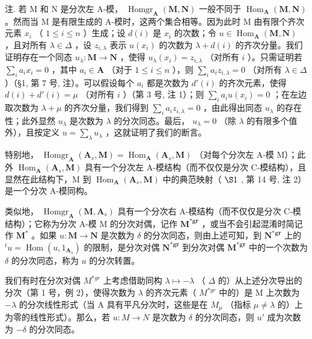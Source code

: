 注. 若 M 和 N 是分次左 A-模， \(\operatorname{Homgr}_{\mathbf{A}}(\mathbf{M}, \mathbf{N})\) 一般不同于 \(\operatorname{Hom}_{\mathbf{A}}(\mathbf{M}, \mathbf{N})\) 。然而当 M 是有限生成的 A-模时，这两个集合相等。因为此时 M 由有限个齐次元素 \(x_{i}\) （ \(1 \leqslant i \leqslant n\) ）生成；设 \(d(i)\) 是 \(x_{i}\) 的次数；令 \(u \in \operatorname{Hom}_{\mathbf{A}}(\mathbf{M}, \mathbf{N})\) ，且对所有 \(\lambda \in \Delta\) ，设 \(z_{i,\lambda}\) 表示 \(u(x_{i})\) 的次数为 \(\lambda + d(i)\) 的齐次分量。我们证明存在一个同态 \(u_{\lambda}: \mathbf{M} \to \mathbf{N}\) ，使得 \(u_{\lambda}(x_{i}) = z_{i,\lambda}\) （对所有 \(i\) ）。只需证明若 \(\sum_{i} a_{i} x_{i} = 0\) ，其中 \(a_{i} \in \mathbf{A}\) （对于 \(1 \leqslant i \leqslant n\) ），则 \(\sum_{i} a_{i} z_{i,\lambda} = 0\) （对所有 \(\lambda \in \Delta\) ）（§1, 第 7 号, 注）。可以假设每个 \(a_{i}\) 都是次数为 \(d'(i)\) 的齐次元素，使得 \(d(i) + d'(i) = \mu\) （对所有 \(i\) ）（第 3 号, 注 1）；则 \(\sum_{i} a_{i} u(x_{i}) = 0\) ；在左边取次数为 \(\lambda + \mu\) 的齐次分量，我们得到 \(\sum_{i} a_{i} z_{i,\lambda} = 0\) ，由此得出同态 \(u_{\lambda}\) 的存在性；此外显然 \(u_{\lambda}\) 是次数为 \(\lambda\) 的分次同态。最后， \(u_{\lambda} = 0\) （除 \(\lambda\) 的有限多个值外），且按定义 \(u = \sum_{\lambda} u_{\lambda}\) ，这就证明了我们的断言。

特别地， \(\operatorname{Homgr}_{\mathbf{A}}(\mathbf{A}_s, \mathbf{M}) = \operatorname{Hom}_{\mathbf{A}}(\mathbf{A}_s, \mathbf{M})\) （对每个分次左 A-模 M）；此外 \(\operatorname{Hom}_{\mathbf{A}}(\mathbf{A}_s, \mathbf{M})\) 具有一个分次左 A-模结构（而不仅仅是分次 C-模结构），且显然在此结构下，M 到 \(\operatorname{Hom}_{\mathbf{A}}(\mathbf{A}_s, \mathbf{M})\) 中的典范映射（ \(\S 1\) , 第 14 号, 注 2）是一个分次 A-模同构。

类似地， \(\operatorname{Homgr}_{\mathbf{A}}(\mathbf{M}, \mathbf{A}_s)\) 具有一个分次右 A-模结构（而不仅仅是分次 C-模结构）；它称为分次 A-模 M 的分次对偶，记作 \(\mathbf{M}^{*\mathbf{gr}}\) ，或当不会引起混淆时简记作 \(\mathbf{M}^*\) 。如果 \(u: \mathbf{M} \to \mathbf{N}\) 是次数为 \(\delta\) 的分次同态，则由上述可知，到 \(\mathbf{N}^{*\mathbf{gr}}\) 上的 \(^t u = \operatorname{Hom}(u, 1_{\mathbf{A}_s})\) 的限制，是分次对偶 \(\mathbf{N}^{*\mathbf{gr}}\) 到分次对偶 \(\mathbf{M}^{*\mathbf{gr}}\) 中的一个次数为 \(\delta\) 的分次同态，称为 \(u\) 的分次转置。

我们有时在分次对偶 \(M^{*gr}\) 上考虑借助同构 \(\lambda\mapsto-\lambda\) （ \(\Delta\) 的）从上述分次导出的分次（第 1 号，例 2），使得次数为 \(\lambda\) 的齐次元素（ \(M^{*gr}\) 中的）是 M 上次数为 \(-\lambda\) 的分次线性形式（当 A 具有平凡分次时，这些是在 \(M_{\mu}\) （指标 \(\mu\neq\lambda\) 的）上为零的线性形式）。那么，若 \(u:M\to N\) 是次数为 \(\delta\) 的分次同态，则 \(u'\) 成为次数为 \(-\delta\) 的分次同态。

